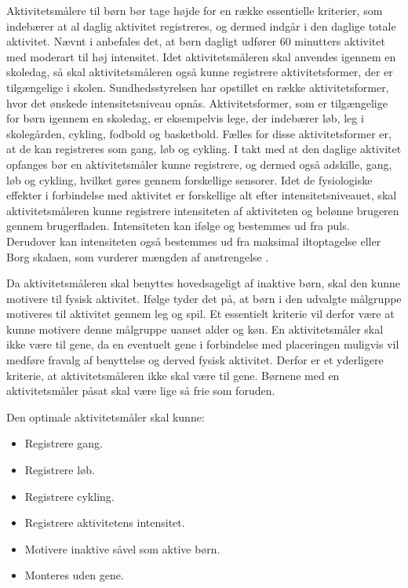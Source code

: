 Aktivitetsmålere til børn bør tage højde for en række essentielle kriterier, som indebærer at al daglig aktivitet registreres, og dermed indgår i den daglige totale aktivitet. Nævnt i  anbefales det, at børn dagligt udfører 60 minutters aktivitet med moderart til høj intensitet. Idet aktivitetsmåleren skal anvendes igennem en skoledag, så skal aktivitetsmåleren også kunne registrere aktivitetsformer, der er tilgængelige i skolen. Sundhedsstyrelsen har opstillet en række aktivitetsformer, hvor det ønskede intensitetsniveau opnås. Aktivitetsformer, som er tilgængelige for børn igennem en skoledag, er eksempelvis lege, der indebærer løb, leg i skolegården, cykling, fodbold og basketbold. Fælles for disse aktivitetsformer er, at de kan registreres som gang, løb og cykling. \citep{Sundhedsstyrelsen2003}
I takt med at den daglige aktivitet opfanges bør en aktivitetsmåler kunne registrere, og dermed også adskille, gang, løb og cykling, hvilket gøres gennem forskellige sensorer. 
Idet de fysiologiske effekter i forbindelse med aktivitet er forskellige alt efter intensitetsniveauet, skal aktivitetsmåleren kunne registrere intensiteten af aktiviteten og belønne brugeren gennem brugerfladen. Intensiteten kan ifølge  og  bestemmes ud fra puls. Derudover kan intensiteten også bestemmes ud fra maksimal iltoptagelse eller Borg skalaen, som vurderer mængden af anstrengelse \citep{Kiens2007}. 

Da aktivitetsmåleren skal benyttes hovedsageligt af inaktive børn, skal den kunne motivere til fysisk aktivitet. Ifølge  tyder det på, at børn i den udvalgte målgruppe motiveres til aktivitet gennem leg og spil. Et essentielt kriterie vil derfor være at kunne motivere denne målgruppe uanset alder og køn. \newline
En aktivitetsmåler skal ikke være til gene, da en eventuelt gene i forbindelse med placeringen muligvis vil medføre fravalg af benyttelse og derved fysisk aktivitet. Derfor er et yderligere kriterie, at aktivitetsmåleren ikke skal være til gene. Børnene med en aktivitetsmåler påsat skal være lige så frie som foruden.

Den optimale aktivitetsmåler skal kunne: 
\begin{itemize}
\item Registrere gang.
\item Registrere løb.
\item Registrere cykling.
\item Registrere aktivitetens intensitet. %
\item Motivere inaktive såvel som aktive børn. %
\item Monteres uden gene.
\end{itemize}

